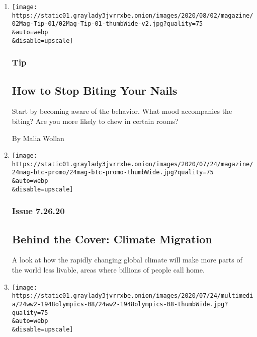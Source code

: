 \begin{enumerate}
\def\labelenumi{\arabic{enumi}.}
\item
  \href{/2020/07/28/magazine/how-to-stop-biting-your-nails.html}{}

  \texttt{[image: https://static01.graylady3jvrrxbe.onion/images/2020/08/02/magazine/02Mag-Tip-01/02Mag-Tip-01-thumbWide-v2.jpg?quality=75\\\&auto=webp\\\&disable=upscale]}

  \hypertarget{tip-}{%
  \subsubsection{Tip }\label{tip-}}

  \hypertarget{how-to-stop-biting-your-nails}{%
  \subsection{How to Stop Biting Your
  Nails}\label{how-to-stop-biting-your-nails}}

  Start by becoming aware of the behavior. What mood accompanies the
  biting? Are you more likely to chew in certain rooms?

  By Malia Wollan
\item
  \href{/2020/07/24/magazine/behind-the-cover-climate-migration.html}{}

  \texttt{[image: https://static01.graylady3jvrrxbe.onion/images/2020/07/24/magazine/24mag-btc-promo/24mag-btc-promo-thumbWide.jpg?quality=75\\\&auto=webp\\\&disable=upscale]}

  \hypertarget{issue-72620}{%
  \subsubsection{Issue 7.26.20}\label{issue-72620}}

  \hypertarget{behind-the-cover-climate-migration}{%
  \subsection{Behind the Cover: Climate
  Migration}\label{behind-the-cover-climate-migration}}

  A look at how the rapidly changing global climate will make more parts
  of the world less livable, areas where billions of people call home.
\item
  \href{/2020/07/24/magazine/1948-olympics-fanny-blankers-koen.html}{}

  \texttt{[image: https://static01.graylady3jvrrxbe.onion/images/2020/07/24/multimedia/24ww2-1948olympics-08/24ww2-1948olympics-08-thumbWide.jpg?quality=75\\\&auto=webp\\\&disable=upscale]}


\end{enumerate}
